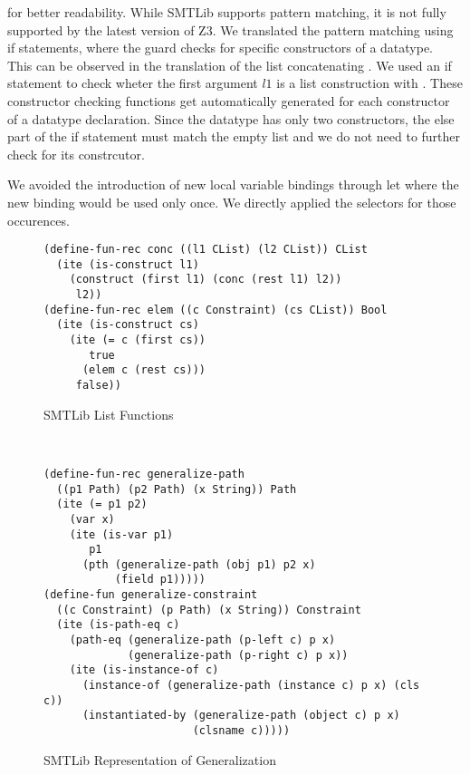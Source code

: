 for better readability. While SMTLib supports pattern matching,
it is not fully supported by the latest version of Z3.
We translated the pattern matching using if statements,
where the guard checks for specific constructors of a datatype.\\
This can be observed in the translation of the list concatenating .
We used an if statement to check wheter the first argument $l1$
is a list construction with .
These constructor checking functions get automatically
generated for each constructor of a datatype declaration.
Since the  datatype has only two constructors,
the else part of the if statement must match the empty list
and we do not need to further check for its constrcutor.

We avoided the introduction of new local variable bindings
through let where the new binding would be used only once.
We directly applied the selectors for those occurences.
%
\begin{figure}[t]
\begin{lstlisting}[language=smtlib]
(define-fun-rec conc ((l1 CList) (l2 CList)) CList
  (ite (is-construct l1)
    (construct (first l1) (conc (rest l1) l2))
     l2))
(define-fun-rec elem ((c Constraint) (cs CList)) Bool
  (ite (is-construct cs)
    (ite (= c (first cs))
       true
      (elem c (rest cs)))
     false))
\end{lstlisting}
\caption{SMTLib List Functions}
\label{fig:smtlib-funs-list}
\end{figure}\\
%
\begin{figure}[h]
\begin{lstlisting}[language=smtlib]
(define-fun-rec generalize-path
  ((p1 Path) (p2 Path) (x String)) Path
  (ite (= p1 p2)
    (var x)
    (ite (is-var p1)
       p1
      (pth (generalize-path (obj p1) p2 x)
           (field p1)))))
(define-fun generalize-constraint
  ((c Constraint) (p Path) (x String)) Constraint
  (ite (is-path-eq c)
    (path-eq (generalize-path (p-left c) p x)
             (generalize-path (p-right c) p x))
    (ite (is-instance-of c)
      (instance-of (generalize-path (instance c) p x) (cls c))
      (instantiated-by (generalize-path (object c) p x)
                       (clsname c)))))
\end{lstlisting}
\caption{SMTLib Representation of Generalization}
\label{fig:smtlib-funs-gen}
\end{figure}\\
%
